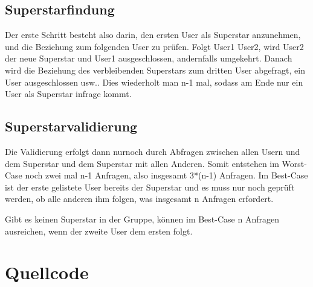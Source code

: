 \documentclass[a4paper,10pt,ngerman]{scrartcl}
\begin{document}
\subsection{Superstarfindung}
Der erste Schritt besteht also darin, den ersten User als Superstar anzunehmen, und die Beziehung zum folgenden User zu prüfen. Folgt User1 User2, wird User2 der neue Superstar und User1 ausgeschlossen, andernfalls umgekehrt. Danach wird die Beziehung des verbleibenden Superstars zum dritten User abgefragt, ein User ausgeschlossen usw.. Dies wiederholt man n-1 mal, sodass am Ende nur ein User als Superstar infrage kommt.

\subsection{Superstarvalidierung}
Die Validierung erfolgt dann nurnoch durch Abfragen zwischen allen Usern und dem Superstar und dem Superstar mit allen Anderen. Somit entstehen im Worst-Case noch zwei mal n-1 Anfragen, also insgesamt 3*(n-1) Anfragen. Im Best-Case ist der erste gelistete User bereits der Superstar und es muss nur noch geprüft werden, ob alle anderen ihm folgen, was insgesamt n Anfragen erfordert.

Gibt es keinen Superstar in der Gruppe, können im Best-Case n Anfragen ausreichen, wenn der zweite User dem ersten folgt.


\section{Quellcode}
\end{document}
